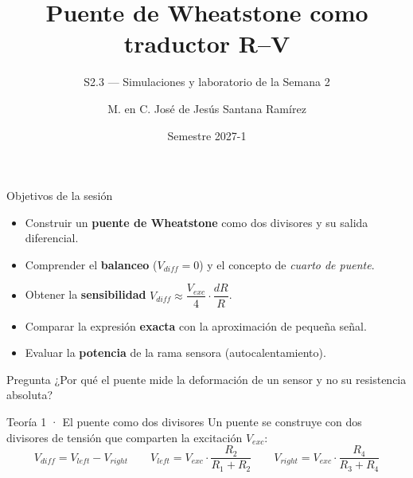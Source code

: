 \documentclass[aspectratio=169]{beamer}
\title[S2.3 · Puente de Wheatstone]{Puente de Wheatstone como traductor R–V}
\subtitle{S2.3 — Simulaciones y laboratorio de la Semana 2}
\institute{Licenciatura en Ingeniería Aeroespacial\\ UNAM · ENES Unidad Juriquilla}
\author{M. en C. José de Jesús Santana Ramírez}
\date{Semestre 2027-1}
\begin{document}
\begin{frame}[plain]
  \titlepage
\end{frame}

\begin{frame}{Objetivos de la sesión}
  \begin{itemize}
    \item Construir un \textbf{puente de Wheatstone} como dos divisores y su salida diferencial.
    \item Comprender el \textbf{balanceo} ($V_{diff} = 0$) y el concepto de \emph{cuarto de puente}.
    \item Obtener la \textbf{sensibilidad} $V_{diff} \approx \dfrac{V_{exc}}{4}\cdot\dfrac{dR}{R}$.
    \item Comparar la expresión \textbf{exacta} con la aproximación de pequeña señal.
    \item Evaluar la \textbf{potencia} de la rama sensora (autocalentamiento).
  \end{itemize}
  \pause
  \begin{block}{Pregunta}
    ¿Por qué el puente mide la deformación de un sensor y no su resistencia absoluta?
  \end{block}
\end{frame}

\begin{frame}{Teoría 1 · El puente como dos divisores}
  Un puente se construye con dos divisores de tensión que comparten la excitación $V_{exc}$:
  \[
    V_{diff} = V_{left} - V_{right}
    \qquad
    V_{left} = V_{exc}\cdot\frac{R_2}{R_1+R_2}
    \qquad
    V_{right} = V_{exc}\cdot\frac{R_4}{R_3+R_4}
  \]
  \begin{center}
  \end{center}
\end{frame}
\end{document}
